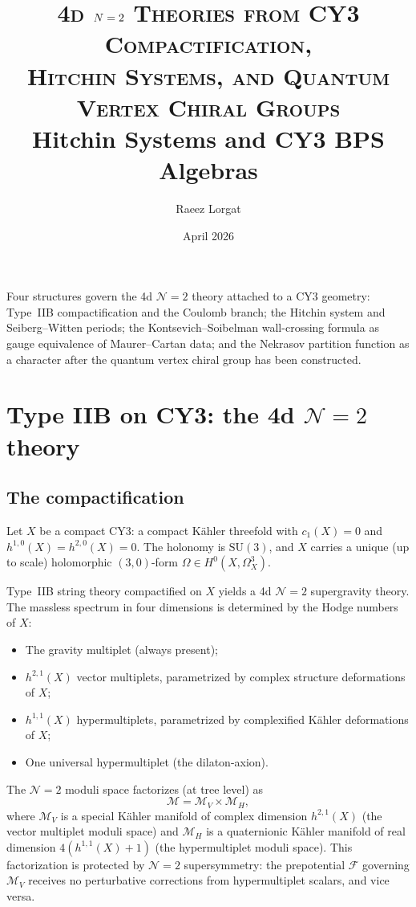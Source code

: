 \documentclass[11pt]{article}
\title{%
 \textsc{4d $\cN=2$ Theories from CY3 Compactification,\\
 Hitchin Systems, and Quantum Vertex Chiral Groups}\\[6pt]
 \normalsize Hitchin Systems and CY3 BPS Algebras
}
\author{Raeez Lorgat}
\date{April 2026}
\theoremstyle{definition}
\theoremstyle{remark}
\newcommand{\cF}{\mathcal{F}}
\newcommand{\cM}{\mathcal{M}}
\newcommand{\cN}{\mathcal{N}}
\newcommand{\SU}{\mathrm{SU}}
\begin{document}
\maketitle

\tableofcontents

\bigskip

\noindent
Four structures govern the 4d $\cN=2$ theory attached to a CY3 geometry: Type~IIB compactification and the Coulomb branch; the Hitchin system and Seiberg--Witten periods; the Kontsevich--Soibelman wall-crossing formula as gauge equivalence of Maurer--Cartan data; and the Nekrasov partition function as a character after the quantum vertex chiral group has been constructed.

\section{Type IIB on CY3: the 4d $\cN=2$ theory}
\label{sec:iib-cy3}

\subsection{The compactification}
\label{subsec:compactification}

Let $X$ be a compact CY3: a compact K\"ahler threefold with $c_1(X) = 0$ and $h^{1,0}(X) = h^{2,0}(X) = 0$. The holonomy is $\SU(3)$, and $X$ carries a unique (up to scale) holomorphic $(3,0)$-form $\Omega \in H^0(X, \Omega_X^3)$.

Type~IIB string theory compactified on $X$ yields a 4d $\cN=2$ supergravity theory. The massless
spectrum in four dimensions is determined by the Hodge numbers of $X$:
\begin{itemize}[nosep]
 \item The gravity multiplet (always present);
 \item $h^{2,1}(X)$ vector multiplets, parametrized by complex structure deformations of $X$;
 \item $h^{1,1}(X)$ hypermultiplets, parametrized by complexified K\"ahler deformations of $X$;
 \item One universal hypermultiplet (the dilaton-axion).
\end{itemize}
The $\cN=2$ moduli space factorizes (at tree level) as
\begin{equation}
 \label{eq:moduli-factorization}
 \cM = \cM_V \times \cM_H,
\end{equation}
where $\cM_V$ is a special K\"ahler manifold of complex dimension $h^{2,1}(X)$ (the vector multiplet
moduli space) and $\cM_H$ is a quaternionic K\"ahler manifold of real dimension $4(h^{1,1}(X)+1)$ (the
hypermultiplet moduli space). This factorization is protected by $\cN=2$ supersymmetry: the
prepotential $\cF$ governing $\cM_V$ receives no perturbative corrections from hypermultiplet scalars,
and vice versa.
\end{document}
